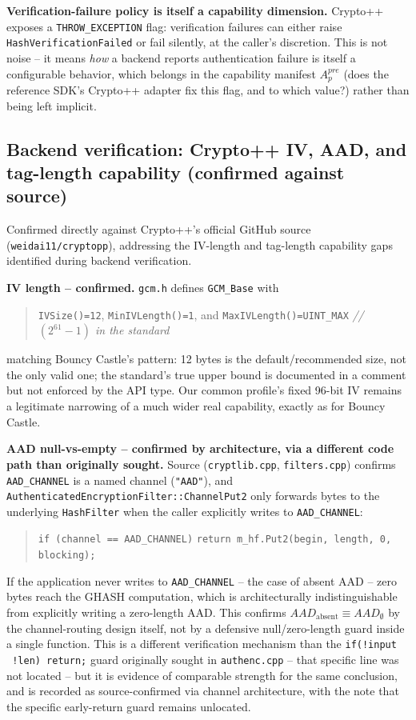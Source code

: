 \documentclass[11pt,a4paper]{article}
\begin{document}
\begin{sloppypar}
\textbf{Verification-failure policy is itself a capability dimension.} Crypto++ exposes a \texttt{THROW\_EXCEPTION} flag: verification failures can either raise \texttt{HashVerificationFailed} or fail silently, at the caller's discretion. This is not noise -- it means \emph{how} a backend reports authentication failure is itself a configurable behavior, which belongs in the capability manifest $A_p^{pre}$ (does the reference SDK's Crypto++ adapter fix this flag, and to which value?) rather than being left implicit.
\end{sloppypar}

\subsection{Backend verification: Crypto++ IV, AAD, and tag-length capability (confirmed against source)}
Confirmed directly against Crypto++'s official GitHub source (\texttt{weidai11/cryptopp}), addressing the IV-length and tag-length capability gaps identified during backend verification.

\textbf{IV length -- confirmed.} \texttt{gcm.h} defines \texttt{GCM\_Base} with
\begin{quote}
\texttt{IVSize()=12}, \texttt{MinIVLength()=1}, and
\texttt{MaxIVLength()=UINT\_MAX} \emph{// $(2^{61}-1)$ in the standard}
\end{quote}
matching Bouncy Castle's pattern: 12 bytes is the default/recommended size, not the only valid one; the standard's true upper bound is documented in a comment but not enforced by the API type. Our common profile's fixed 96-bit IV remains a legitimate narrowing of a much wider real capability, exactly as for Bouncy Castle.

\textbf{AAD null-vs-empty -- confirmed by architecture, via a different code path than originally sought.} Source (\texttt{cryptlib.cpp}, \texttt{filters.cpp}) confirms \texttt{AAD\_CHANNEL} is a named channel (\texttt{"AAD"}), and \texttt{AuthenticatedEncryptionFilter::ChannelPut2} only forwards bytes to the underlying \texttt{HashFilter} when the caller explicitly writes to \texttt{AAD\_CHANNEL}:
\begin{quote}
\texttt{if (channel == AAD\_CHANNEL)} \texttt{return m\_hf.Put2(begin, length, 0, blocking);}
\end{quote}
If the application never writes to \texttt{AAD\_CHANNEL} -- the case of absent AAD -- zero bytes reach the GHASH computation, which is architecturally indistinguishable from explicitly writing a zero-length AAD. This confirms $AAD_{\text{absent}} \equiv AAD_{\emptyset}$ by the channel-routing design itself, not by a defensive null/zero-length guard inside a single function. This is a different verification mechanism than the \texttt{if(!input \textbar\textbar\ !len) return;} guard originally sought in \texttt{authenc.cpp} -- that specific line was not located -- but it is evidence of comparable strength for the same conclusion, and is recorded as source-confirmed via channel architecture, with the note that the specific early-return guard remains unlocated.
\end{document}
